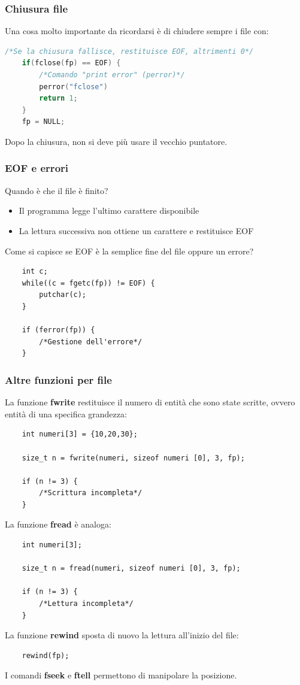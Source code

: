 \documentclass[12pt,a4paper]{article}
\begin{document}
\subsubsection{Chiusura file}
Una cosa molto importante da ricordarsi è di chiudere sempre i file con:
\begin{lstlisting}[language=C]
    /*Se la chiusura fallisce, restituisce EOF, altrimenti 0*/
    if(fclose(fp) == EOF) {
        /*Comando "print error" (perror)*/
        perror("fclose")
        return 1;
    }
    fp = NULL;
\end{lstlisting}
Dopo la chiusura, non si deve più usare il vecchio puntatore.
\subsubsection{EOF e errori}
Quando è che il file è finito?
\begin{itemize}
    \item Il programma legge l'ultimo carattere disponibile
    \item La lettura successiva non ottiene un carattere e restituisce EOF
\end{itemize}
Come si capisce se EOF è la semplice fine del file oppure un errore?
\begin{lstlisting}
    int c;
    while((c = fgetc(fp)) != EOF) {
        putchar(c);
    }

    if (ferror(fp)) {
        /*Gestione dell'errore*/
    }
\end{lstlisting}
\subsubsection{Altre funzioni per file}
La funzione \textbf{fwrite} restituisce il numero di entità che sono state scritte, ovvero entità di una specifica grandezza:
\begin{lstlisting}
    int numeri[3] = {10,20,30};

    size_t n = fwrite(numeri, sizeof numeri [0], 3, fp);

    if (n != 3) { 
        /*Scrittura incompleta*/
    }
\end{lstlisting}
La funzione \textbf{fread} è analoga:
\begin{lstlisting}
    int numeri[3];

    size_t n = fread(numeri, sizeof numeri [0], 3, fp);

    if (n != 3) {
        /*Lettura incompleta*/
    }
\end{lstlisting}
La funzione \textbf{rewind} sposta di nuovo la lettura all'inizio del file:
\begin{lstlisting}
    rewind(fp);
\end{lstlisting}
I comandi \textbf{fseek} e \textbf{ftell} permettono di manipolare la posizione.
\end{document}
